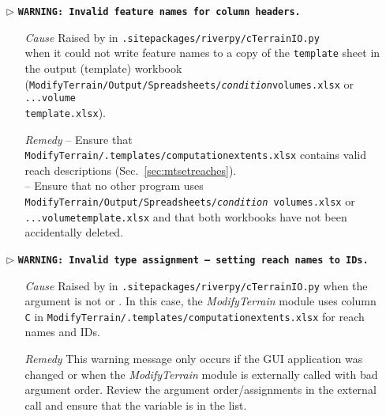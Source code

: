 \begin{itemize}
	\item[$\triangleright$]\textbf{\texttt{WARNING: Invalid feature names for column headers.}}
	\begin{itemize}
		\item[\textit{Cause}\hspace{0.27cm}] Raised by  in \texttt{.site{\myUnderscore}packages/riverpy/cTerrainIO.py}\\when it could not write feature names to a copy of the \texttt{template} sheet in the output (template) workbook (\texttt{ModifyTerrain/Output/Spreadsheets/\textit{condition}{\myUnderscore}volumes.xlsx} or \texttt{...volume{\myUnderscore}}\\ \texttt{template.xlsx}).
		\item[\textit{Remedy}] -- Ensure that \texttt{ModifyTerrain/.templates/computation{\myUnderscore}extents.xlsx} contains valid reach descriptions (Sec.~\ref{sec:mtsetreaches}).\\
							   -- Ensure that no other program uses \texttt{ModifyTerrain/Output/Spreadsheets/\textit{condition}{\myUnderscore} volumes.xlsx} or \texttt{...volume{\myUnderscore}template.xlsx} and that both workbooks have not been accidentally deleted.\\
	\end{itemize}
	
	\item[$\triangleright$]\textbf{\texttt{WARNING: Invalid type assignment -- setting reach names to IDs.}}
	\begin{itemize}
		\item[\textit{Cause}\hspace{0.27cm}] Raised by  in \texttt{.site{\myUnderscore}packages/riverpy/cTerrainIO.py} when the  argument is not  or . In this case, the \textit{ModifyTerrain} module uses column \texttt{C} in \texttt{ModifyTerrain/.templates/computation{\myUnderscore}extents.xlsx} for reach names and IDs.
		\item[\textit{Remedy}] This warning message only occurs if the GUI application was changed or when the \textit{ModifyTerrain} module is externally called with bad argument order. Review the argument order/assignments in the external call and ensure that the  variable is in the  list.\\
	\end{itemize}
	

\end{itemize}
